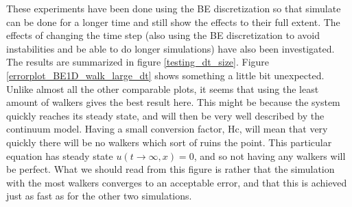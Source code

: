 These experiments have been done using the BE discretization so that simulate can be done for a longer time and still show the effects to their full extent. 
The effects of changing the time step (also using the BE discretization to avoid instabilities and be able to do longer simulations) have also been investigated. 
The results are summarized in figure \ref{testing_dt_size}. 
Figure \ref{errorplot_BE1D_walk_large_dt} shows something a little bit unexpected. 
Unlike almost all the other comparable plots, it seems that using the least amount of walkers gives the best result here. 
This might be because the system quickly reaches its steady state, and will then be very well described by the continuum model. 
Having a small conversion factor, Hc, will mean that very quickly there will be no walkers which sort of ruins the point. 
This particular equation has steady state $u(t\to\infty,x) = 0$, and so not having any walkers will be perfect. 
What we should read from this figure is rather that the simulation with the most walkers converges to an acceptable error, and that this is achieved just as fast as for the other two simulations.



